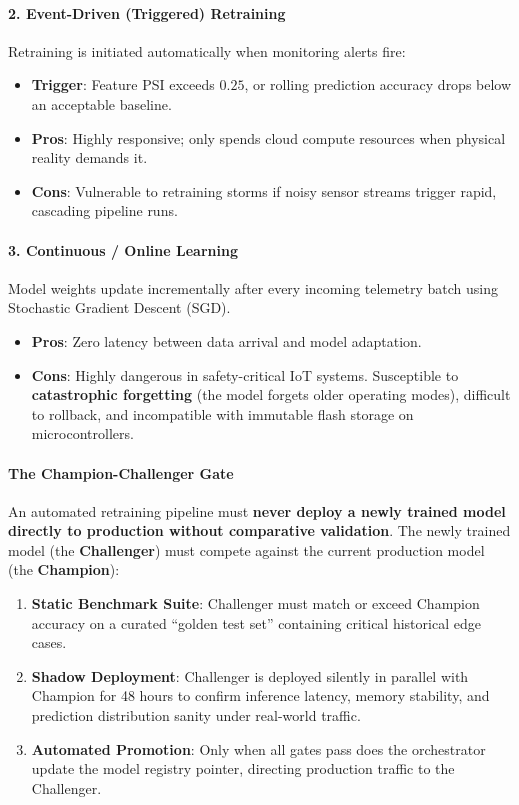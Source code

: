 \paragraph{2. Event-Driven (Triggered) Retraining}
Retraining is initiated automatically when monitoring alerts fire:
\begin{itemize}
    \item \textbf{Trigger}: Feature PSI exceeds $0.25$, or rolling prediction accuracy drops below an acceptable baseline.
    \item \textbf{Pros}: Highly responsive; only spends cloud compute resources when physical reality demands it.
    \item \textbf{Cons}: Vulnerable to retraining storms if noisy sensor streams trigger rapid, cascading pipeline runs.
\end{itemize}

\paragraph{3. Continuous / Online Learning}
Model weights update incrementally after every incoming telemetry batch using Stochastic Gradient Descent (SGD).
\begin{itemize}
    \item \textbf{Pros}: Zero latency between data arrival and model adaptation.
    \item \textbf{Cons}: Highly dangerous in safety-critical IoT systems. Susceptible to \textbf{catastrophic forgetting} (the model forgets older operating modes), difficult to rollback, and incompatible with immutable flash storage on microcontrollers.
\end{itemize}

\paragraph{The Champion-Challenger Gate}
An automated retraining pipeline must \textbf{never deploy a newly trained model directly to production without comparative validation}. 
The newly trained model (the \textbf{Challenger}) must compete against the current production model (the \textbf{Champion}):
\begin{enumerate}
    \item \textbf{Static Benchmark Suite}: Challenger must match or exceed Champion accuracy on a curated ``golden test set'' containing critical historical edge cases.
    \item \textbf{Shadow Deployment}: Challenger is deployed silently in parallel with Champion for 48 hours to confirm inference latency, memory stability, and prediction distribution sanity under real-world traffic.
    \item \textbf{Automated Promotion}: Only when all gates pass does the orchestrator update the model registry pointer, directing production traffic to the Challenger.
\end{enumerate}

